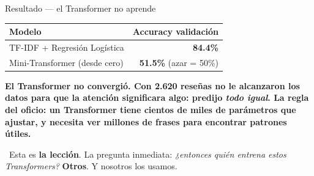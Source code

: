 \documentclass[aspectratio=169, 11pt]{beamer}
\begin{document}
\begin{frame}[shrink]{Resultado --- el Transformer no aprende}
  \vspace{4pt}
  \begin{center}
  \begin{tabular}{lr}
    \toprule
    \textbf{Modelo} & \textbf{Accuracy validación}\\
    \midrule
    \rowcolor{arcaGray}
    TF-IDF + Regresión Logística & \textbf{84.4\%}\\
    Mini-Transformer (desde cero) & \color{arcaRed}\textbf{51.5\%} (azar = 50\%)\\
    \bottomrule
  \end{tabular}
  \end{center}
  \vspace{10pt}
  \begin{tcolorbox}[colback=arcaRed!8, colframe=arcaRed, leftrule=3pt,
    boxrule=0pt, sharp corners, left=8pt, right=8pt, top=6pt, bottom=6pt]
    {\footnotesize\color{arcaDark}\bfseries
    El Transformer no convergió. Con 2.620 reseñas no le alcanzaron los datos
    para que la atención significara algo: predijo \emph{todo igual}. La regla del
    oficio: un Transformer tiene cientos de miles de parámetros que ajustar, y
    necesita ver \textbf{millones} de frases para encontrar patrones útiles.}
  \end{tcolorbox}
  \vspace{6pt}
  \begin{tcolorbox}[colback=arcaGray, colframe=arcaRed, leftrule=3pt,
    boxrule=0pt, sharp corners, left=8pt, right=8pt, top=4pt, bottom=4pt]
    {\footnotesize\color{arcaDark}
    \faLightbulb~Esta es \textbf{la lección}. La pregunta inmediata: \emph{¿entonces
    quién entrena estos Transformers?} \textbf{Otros}. Y nosotros los usamos.}
  \end{tcolorbox}
\end{frame}
\end{document}
